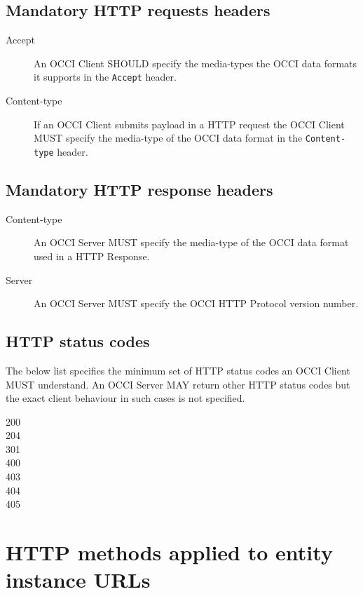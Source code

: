\documentclass[10pt,a4paper]{article}
\begin{document}
\subsection{Mandatory HTTP requests headers}

\begin{description}
\item[Accept] An OCCI Client SHOULD specify the media-types the OCCI data
formats it supports in the {\tt Accept} header.

\item[Content-type] If an OCCI Client submits payload in a HTTP request
the OCCI Client MUST specify the media-type of the OCCI data format
in the {\tt Content-type} header.
\end{description}

\subsection{Mandatory HTTP response headers}

\begin{description}
\item[Content-type] An OCCI Server MUST specify the media-type of the OCCI data
format used in a HTTP Response.
\item[Server] An OCCI Server MUST specify the OCCI HTTP Protocol version number.
\end{description}

\subsection{HTTP status codes}

The below list specifies the minimum set of HTTP status codes an OCCI Client MUST
understand. An OCCI Server MAY return other HTTP status codes but the exact client
behaviour in such cases is not specified.

\begin{description}
\item[200]
\item[204]
\item[301]
\item[400]
\item[403]
\item[404]
\item[405]
\end{description}


\section{HTTP methods applied to entity instance URLs}
\end{document}
